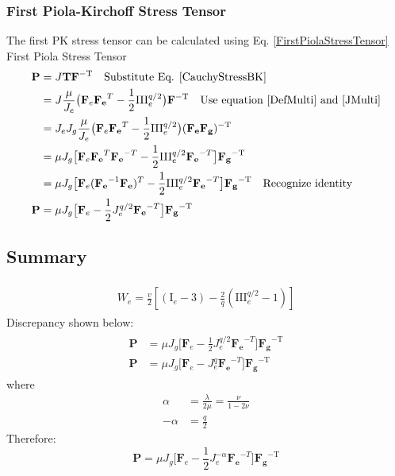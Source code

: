 \documentclass[12pt,3p]{article}
\numberwithin{equation}{section}
\begin{document}
\subsubsection{First Piola-Kirchoff Stress Tensor}
The first PK stress tensor can be calculated using Eq. \ref{FirstPiolaStressTensor}
First Piola Stress Tensor
\begin{align*}
\mathbf{P} &= J \mathbf{T} \mathbf{F}^{-\mathrm{T}} \quad \text{Substitute Eq. \ref{CauchyStressBK}} \\
		 &= J \frac{\mu}{J_e} \big( \mathbf{F}_{e} \mathbf{F_e}^T - \frac{1}{2} \mathrm{III}_e^{q/2} \big)  \mathbf{F}^{-\mathrm{T}} \quad \text{Use equation \ref{DefMulti} and \ref{JMulti}} \\
		 &= J_e J_g \frac{\mu}{J_e} \big( \mathbf{F}_{e} \mathbf{F_e}^T - \frac{1}{2} \mathrm{III}_e^{q/2} \big)  (\mathbf{F_e} \mathbf{F_g})^{-\mathrm{T}} \\
		 &= \mu J_g \big[ \mathbf{F}_{e} \mathbf{F_e}^T \mathbf{F_e}^{-T} - \frac{1}{2} \mathrm{III}_e^{q/2} \mathbf{F_e}^{-T} \big] \mathbf{F_g}^{-\mathrm{T}} \\
		 &= \mu J_g \big[ \mathbf{F}_{e} (\mathbf{F_e}^{-1} \mathbf{F_e})^{T} - \frac{1}{2} \mathrm{III}_e^{q/2} \mathbf{F_e}^{-T} \big] \mathbf{F_g}^{-\mathrm{T}} \quad \text{Recognize identity} \\
\mathbf{P} &= \mu J_g \big[ \mathbf{F}_{e} - \frac{1}{2} J_e^{q/2} \mathbf{F_e}^{-T} \big] \mathbf{F_g}^{-\mathrm{T}}
\end{align*}

\subsection{Summary}
\begin{align}\label{AMFinalEquations}
\begin{split}
W_{e} = \frac{v}{2} \left[ \left(\mathrm{I}_{e}-3\right) -\frac{2}{q} \left(\mathrm{III}_{e}^{q / 2}-1\right) \right] 
\end{split}
\end{align}
Discrepancy shown below:
\begin{align}
\begin{split}
\mathbf{P} &= \mu J_g \big[ \mathbf{F}_{e} - \frac{1}{2} J_e^{q/2} \mathbf{F_e}^{-T} \big] \mathbf{F_g}^{-\mathrm{T}} \\
\mathbf{P} &= \mu J_g \big[ \mathbf{F}_{e} - J_e^{q} \mathbf{F_e}^{-T} \big] \mathbf{F_g}^{-\mathrm{T}}
\end{split}
\end{align}
where 
\begin{align*}
\alpha &= \frac{\lambda}{2 \mu} = \frac{\nu}{1 - 2 \nu} \\
- \alpha &= \frac{q}{2}
\end{align*}
Therefore: 
\begin{equation}
\mathbf{P} = \mu J_g \big[ \mathbf{F}_{e} - \frac{1}{2} J_e^{- \alpha} \mathbf{F_e}^{-T} \big] \mathbf{F_g}^{-\mathrm{T}} 
\end{equation}
\end{document}
